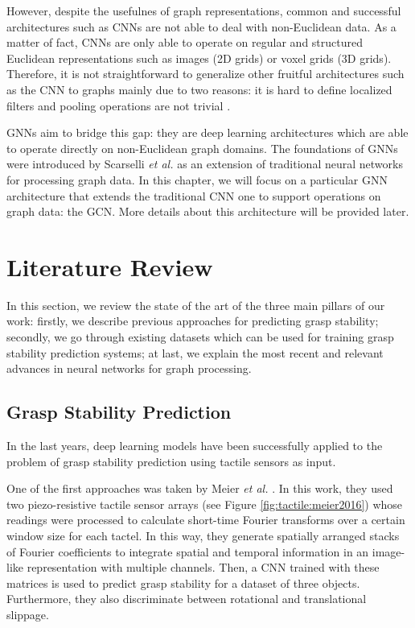 However, despite the usefulnes of graph representations, common and successful architectures such as \aclp{CNN} are not able to deal with non-Euclidean data. As a matter of fact, \acp{CNN} are only able to operate on regular and structured Euclidean representations such as images (\acs{2D} grids) or voxel grids (\acs{3D} grids). Therefore, it is not straightforward to generalize other fruitful architectures such as the \ac{CNN} to graphs mainly due to two reasons: it is hard to define localized filters and pooling operations are not trivial \cite{Zhou2018}.

\acfp{GNN} aim to bridge this gap: they are deep learning architectures which are able to operate directly on non-Euclidean graph domains. The foundations of \acp{GNN} were introduced by Scarselli \emph{et al.} \cite{Scarselli2008} as an extension of traditional neural networks for processing graph data. In this chapter, we will focus on a particular \ac{GNN} architecture that extends the traditional \ac{CNN} one to support operations on graph data: the \acf{GCN}. More details about this architecture will be provided later.

\section{Literature Review}
\label{cha:tactile:sec:relatedworks}

In this section, we review the state of the art of the three main pillars of our work: firstly, we describe previous approaches for predicting grasp stability; secondly, we go through existing datasets which can be used for training grasp stability prediction systems; at last, we explain the most recent and relevant advances in neural networks for graph processing.

\subsection{Grasp Stability Prediction}
\label{cha:tactile:sec:relatedworks:subsec:grasp-stability-prediction}

In the last years, deep learning models have been successfully applied to the problem of grasp stability prediction using tactile sensors as input.

One of the first approaches was taken by Meier \emph{et al.} \cite{Meier2016a}. In this work, they used two piezo-resistive tactile sensor arrays (see Figure \ref{fig:tactile:meier2016}) whose readings were processed to calculate short-time Fourier transforms over a certain window size for each tactel. In this way, they generate spatially arranged stacks of Fourier coefficients to integrate spatial and temporal information in an image-like representation with multiple channels. Then, a \ac{CNN} trained with these matrices is used to predict grasp stability for a dataset of three objects. Furthermore, they also discriminate between rotational and translational slippage.

